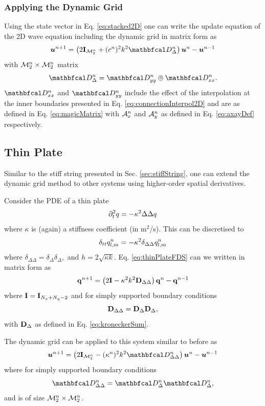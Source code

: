 \documentclass[fleqn]{jaes}
\begin{document}
\subsubsection{Applying the Dynamic Grid}
Using the state vector in Eq. \eqref{eq:stacked2D} one can write the update equation of the 2D wave equation including the dynamic grid in matrix form as
\begin{equation}
    \uStack^{n+1} = \left(2\I_\MtwoD + (c^n)^2k^2\DDdelta\right)\uStack^n -\uStack^{n-1}
\end{equation}
with ${\mathcal{M}_2^n} \times {\mathcal{M}_2^n}$ matrix
\begin{equation}
    \DDdelta = \DDyy \oplus \DDxx.
\end{equation}
$\DDxx$ and $\DDyy$ include the effect of the interpolation at the inner boundaries presented in Eq. \eqref{eq:connectionInterpol2D} and are as defined in Eq. \eqref{eq:magicMatrix} with $\mathcal{A}^n_x$ and $\mathcal{A}^n_y$ as defined in Eq. \eqref{eq:axayDef} respectively. 

\subsection{Thin Plate}
Similar to the stiff string presented in Sec. \ref{sec:stiffString}, one can extend the dynamic grid method to other systems using higher-order spatial derivatives.

Consider the PDE of a thin plate \cite{Morse1968}
\begin{equation}\label{eq:thinPlateFDS}
    \ptt q = -\kappa^2\Delta\Delta q
\end{equation}
where $\kappa$ is (again) a stiffness coefficient (in m$^2$/s). This can be discretised to 
\begin{equation}
    \delta_{tt}q_{l,m}^n = -\kappa^2\delta_{\Delta\Delta}q_{l,m}^n
\end{equation}
where $\delta_{\Delta\Delta} = \delta_{\Delta}\delta_{\Delta},$ and $ h = 2\sqrt{\kappa k}$. 
Eq. \eqref{eq:thinPlateFDS} can we written in matrix form as
\begin{equation}
    \mathbf{q}^{n+1} = \left(2\mathbf{I} - \kappa^2 k^2 \mathbf{D}_{\Delta\Delta}\right)\mathbf{q}^n - \mathbf{q}^{n-1}
\end{equation}
where $\mathbf{I} = \mathbf{I}_{N_x + N_y - 2}$ and for simply supported boundary conditions
\begin{equation}
    \mathbf{D}_{\Delta\Delta} = \mathbf{D}_\Delta\mathbf{D}_\Delta,
\end{equation}
with $\mathbf{D}_\Delta$ as defined in Eq. \eqref{eq:kroneckerSum}.

The dynamic grid can be applied to this system similar to before as
\begin{equation}
    \uStack^{n+1} = \left(2\I_\MtwoD - (\kappa^n)^2 k^2 \DDDeltaDelta\right)\uStack^n - \uStack^{n-1}
\end{equation}
where for simply supported boundary conditions
\begin{equation}
    \DDDeltaDelta = \DDDelta\DDdelta,
\end{equation}
and is of size ${\mathcal{M}_2^n} \times {\mathcal{M}_2^n}$.
\end{document}
